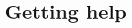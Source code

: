 \documentclass[12pt,twoside]{article}   %
\begin{document}
% 
% 
% 
% 

\section{Getting help}
\label{help}
\end{document}
